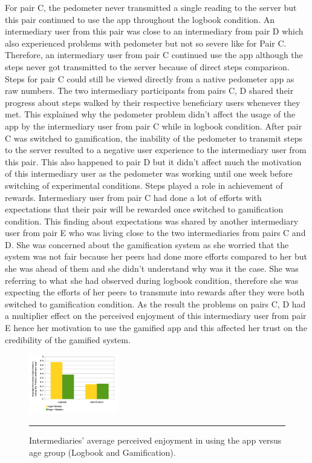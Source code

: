 \documentclass{sig-alternate}
\begin{document}
For pair C, the pedometer never transmitted a single reading to the server but this pair continued to use the app throughout the logbook condition. An intermediary user from this pair was close to an intermediary from pair D which also experienced problems with pedometer but not so severe like for Pair C. Therefore, an intermediary user from pair C continued use the app although the steps never got transmitted to the server because of direct steps comparison. Steps for pair C could still be viewed directly from a native pedometer app as raw numbers. The two intermediary participants from pairs C, D shared their progress about steps walked by their respective beneficiary users whenever they met. This explained why the pedometer problem didn't affect the usage of the app by the intermediary user from pair C while in logbook condition. After pair C was switched to gamification, the inability of the pedometer to transmit steps to the server resulted to a negative user experience to the intermediary user from this pair. This also happened to pair D but it didn't affect much the motivation of this intermediary user as the pedometer was working until one week before switching of experimental conditions. Steps played a role in achievement of rewards. Intermediary user from pair C had done a lot of efforts with expectations that their pair will be rewarded once switched to gamification condition. This finding about expectations was shared by another intermediary user from pair E who was living close  to the two intermediaries from pairs C and D. She was concerned about the gamification system as she worried that the system was not fair because her peers had done more efforts compared to her but she was ahead of them and she didn't understand why was it the case. She was referring to what she had observed during logbook condition,  therefore she was expecting the efforts of her peers to transmute into rewards after they were both switched to gamification condition. As the result the problems on pairs C, D had a multiplier  effect on the perceived enjoyment of this intermediary user from pair E hence her motivation to use the gamified app and this affected her trust on the credibility of the gamified system.

\begin{figure}[htbp]
  \centering
    \includegraphics[width=0.35\textwidth]{PE_Interm_App_exp_seq.png}
    \rule{26em}{0.5pt}
  \caption{Intermediaries' average perceived enjoyment in using the app versus age group (Logbook and Gamification).}
  \label{figure:PE_Interm_App_exp_seq}
\end{figure}
\end{document}
